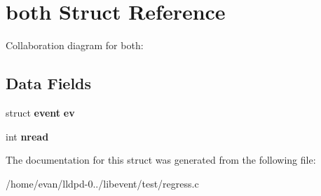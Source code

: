 \section{both \-Struct \-Reference}
\label{structboth}


\-Collaboration diagram for both\-:
\subsection*{\-Data \-Fields}
\begin{DoxyCompactItemize}
\item 
struct {\bf event} {\bfseries ev}\label{structboth_ace3e34472d1f55b6a831df15ff5e2d9c}

\item 
int {\bfseries nread}\label{structboth_a2f76c346634c5411f19e0cc32070ba3b}

\end{DoxyCompactItemize}


\-The documentation for this struct was generated from the following file\-:\begin{DoxyCompactItemize}
\item 
/home/evan/lldpd-\/0../libevent/test/regress.\-c\end{DoxyCompactItemize}
